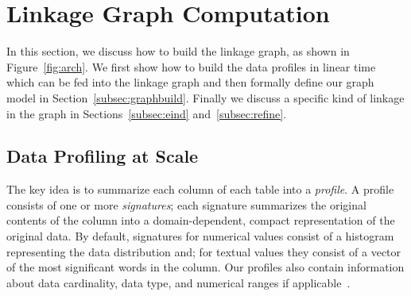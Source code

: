 \section{Linkage Graph Computation}
\label{sec:stitching}

In this section, we discuss how to build the linkage graph, as shown in Figure~\ref{fig:arch}. We first show how to build the data profiles in linear time which can be fed into the linkage graph and then formally define our graph model in Section~\ref{subsec:graphbuild}. Finally we discuss a specific kind of linkage in the graph in Sections~\ref{subsec:eind} and~\ref{subsec:refine}.



\subsection{Data Profiling at Scale}\label{subsec:profile}

The key idea is to summarize each column of each table into a {\em profile}.
A profile consists of one or more {\it signatures};  each signature summarizes
the original contents of the column into a domain-dependent, compact
representation of the original data.  By default, signatures for numerical values consist of a
histogram representing the data distribution and; for textual values they consist of a vector
of the most significant words in the column.  Our profiles also
contain information about data cardinality, data type, and numerical ranges if
applicable~\cite{profiling_survey}.


